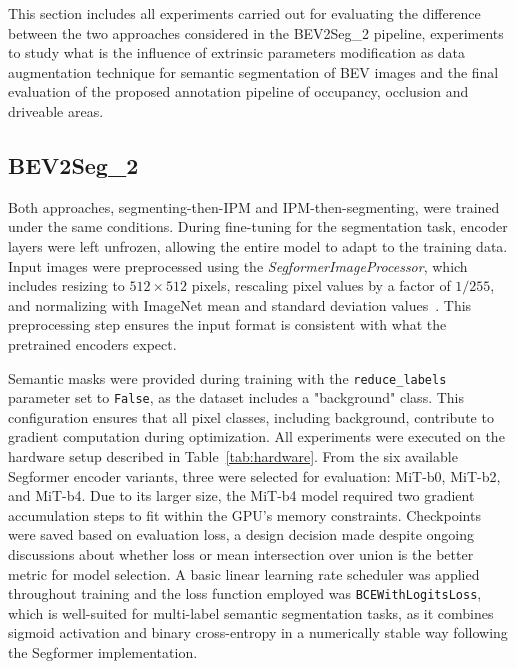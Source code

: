 
This section includes all experiments carried out for evaluating the difference between the two approaches considered in the BEV2Seg\_2 pipeline, experiments to study what is the influence of extrinsic parameters modification as data augmentation technique for semantic segmentation of BEV images and the final evaluation of the proposed annotation pipeline of occupancy, occlusion and driveable areas.

\subsection{BEV2Seg\_2}

Both approaches, segmenting-then-IPM and IPM-then-segmenting, were trained under the same conditions. During fine-tuning for the segmentation task, encoder layers were left unfrozen, allowing the entire model to adapt to the training data. Input images were preprocessed using the \textit{SegformerImageProcessor}, which includes resizing to $512 \times 512$ pixels, rescaling pixel values by a factor of $1/255$, and normalizing with ImageNet mean and standard deviation values~\cite{imagenet}. This preprocessing step ensures the input format is consistent with what the pretrained encoders expect.

Semantic masks were provided during training with the \texttt{reduce\_labels} parameter set to \texttt{False}, as the dataset includes a "background" class. This configuration ensures that all pixel classes, including background, contribute to gradient computation during optimization. All experiments were executed on the hardware setup described in Table~\ref{tab:hardware}. From the six available Segformer encoder variants, three were selected for evaluation: MiT-b0, MiT-b2, and MiT-b4. Due to its larger size, the MiT-b4 model required two gradient accumulation steps to fit within the GPU's memory constraints. Checkpoints were saved based on evaluation loss, a design decision made despite ongoing discussions about whether loss or mean intersection over union is the better metric for model selection. A basic linear learning rate scheduler was applied throughout training and the loss function employed was \texttt{BCEWithLogitsLoss}, which is well-suited for multi-label semantic segmentation tasks, as it combines sigmoid activation and binary cross-entropy in a numerically stable way following the Segformer implementation.

